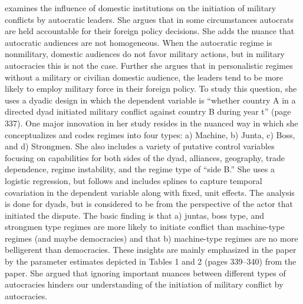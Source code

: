 \citet{weeks:2012} examines the influence of domestic institutions on the initiation of military conflicts by autocratic leaders.  She argues that in some circumstances autocrats are held accountable for their foreign policy decisions. She adds the nuance that autocratic audiences are not homogeneous. When the autocratic regime is nonmilitary, domestic audiences do not favor military actions, but in military autocracies this is not the case. Further she argues that in personalistic regimes without a military or civilian domestic audience, the leaders tend to be more likely to employ military force in their foreign policy.  To study this question, she uses a dyadic design in which the dependent variable is ``whether country A in a directed dyad initiated military conflict against country B during year t'' (page 337).  One major innovation in her study resides in the nuanced way in which she conceptualizes and codes regimes into four types: a) Machine, b) Junta, c) Boss, and d) Strongmen. She also includes a variety of putative control variables focusing on capabilities for both sides of the dyad, alliances, geography, trade dependence, regime instability, and the regime type of ``side B.'' She uses a logistic regression, but follows \citet{beck:etal:1998} and includes splines to capture temporal covariation in the dependent variable along with fixed, unit effects. The analysis is done for dyads, but is considered to be from the perspective of the actor that initiated the dispute. The basic finding is that a) juntas, boss type, and strongmen type regimes are more likely to initiate conflict than machine-type regimes (and maybe democracies) and that b) machine-type regimes are no more belligerent than democracies.   These insights are mainly emphasized in the paper by the parameter estimates depicted in Tables 1 and 2 (pages 339--340) from the paper. She argued that ignoring important nuances between different types of autocracies hinders our understanding of the initiation of military conflict by autocracies. 

